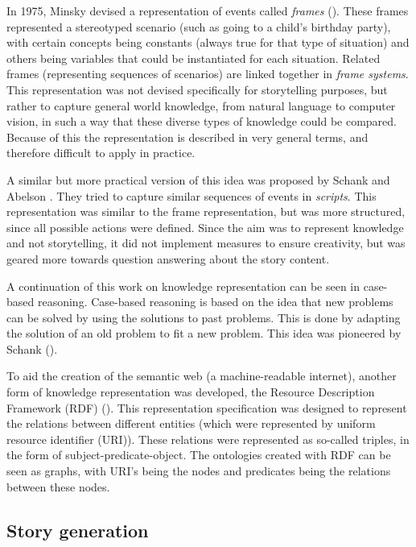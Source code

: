 In 1975, Minsky devised a representation of events called \emph{frames}
(\cite{minsky1975framework}). These frames represented a stereotyped scenario
(such as going to a child's birthday party), with certain concepts being constants
(always true for that type of situation) and others being variables that could
be instantiated for each situation. Related frames (representing sequences of
scenarios) are linked together in \emph{frame systems}. This representation was
not devised specifically for storytelling purposes, but rather to capture
general world knowledge, from natural language to computer vision, in such a way
that these diverse types of knowledge could be compared. Because of this the
representation is described in very general terms, and therefore difficult to
apply in practice.

A similar but more practical version of this idea was proposed by Schank and Abelson
\cite{schank1975scripts}. They
tried to capture similar sequences of events in \emph{scripts}. This
representation was similar to the frame representation, but was more structured,
since all possible actions were defined. Since the aim was to represent
knowledge and not storytelling, it did not implement measures to ensure
creativity, but was geared more towards question answering about the story
content.

A continuation of this work on knowledge representation can be seen in case-based reasoning.
Case-based reasoning is based on the idea that new problems can be solved by
using the solutions to past problems. This is done by adapting the solution of
an old problem to fit a new problem. This idea was pioneered by Schank
(\cite{schank1983dynamic}).

To aid the creation of the semantic web (a machine-readable internet), another
form of knowledge representation was developed, the Resource Description
Framework (RDF) (\cite{klynecarrollrdf}). This representation specification was
designed to represent the relations between different entities (which were
represented by uniform resource identifier (URI)). These relations were
represented as so-called triples, in the form of subject-predicate-object. The
ontologies created with RDF can be seen as graphs, with URI's being the nodes
and predicates being the relations between these nodes.

\subsection{Story generation}

